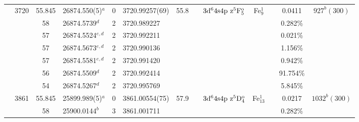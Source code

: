 \begin{table*}
\begin{center}
{\begin{tabular}{:l;l;c;l;c;l;c;l;l;c;c;c;c}
                                  & 3720   & 55.845    & 26874.550(5)$^{a}$               & 0 &    3720.99257(69)  & 55.8 & $                                        $ & $3\rm{d}^64\rm{s}4\rm{p~z}^5\rm{F}_{5}^{\rm o}$ & Fe$^1_{9}$  &              & 0.0411    & $  927^{b}(300)$\\
\rowstyle{\itshape}               &        & 58        & 26874.5739$^{d}$                 & 2 &   3720.989227      &      & $                                        $ & $                                        $ &             &              & 0.282\%   & $     ^{}     $\\
\rowstyle{\itshape}               &        & 57        & 26874.5524$^{e,d}$               & 2 &   3720.992211      &      & $                                        $ & $                                        $ &             &              & 0.021\%   & $     ^{}     $\\
\rowstyle{\itshape}               &        & 57        & 26874.5673$^{e,d}$               & 2 &   3720.990136      &      & $                                        $ & $                                        $ &             &              & 1.156\%   & $     ^{}     $\\
\rowstyle{\itshape}               &        & 57        & 26874.5581$^{e,d}$               & 2 &   3720.991420      &      & $                                        $ & $                                        $ &             &              & 0.942\%   & $     ^{}     $\\
\rowstyle{\itshape}               &        & 56        & 26874.5509$^{d}$                 & 2 &   3720.992414      &      & $                                        $ & $                                        $ &             &              & 91.754\%  & $     ^{}     $\\
\rowstyle{\itshape}               &        & 54        & 26874.5267$^{d}$                 & 2 &   3720.995769      &      & $                                        $ & $                                        $ &             &              & 5.845\%   & $     ^{}     $\\
                                  & 3861   & 55.845    & 25899.989(5)$^{a}$               & 0 &    3861.00554(75)  & 57.9 & $                                        $ & $3\rm{d}^64\rm{s}4\rm{p~z}^5\rm{D}_{4}^{\rm o}$ & Fe$^1_{13}$ &              & 0.0217    & $ 1032^{b}(300)$\\
\rowstyle{\itshape}               &        & 58        & 25900.0144$^{b}$                 & 3 &   3861.001711      &      & $                                        $ & $                                        $ &             &              & 0.282\%   & $     ^{}     $\\

\end{tabular}}
\end{center}
\end{table*}
